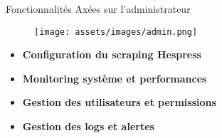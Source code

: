 \begin{frame}{Fonctionnalités Axées sur l'administrateur}
    \begin{figure}[H]
        \centering
        \texttt{[image: assets/images/admin.png]}
    \end{figure}

    \begin{itemize}
        \setlength\itemsep{0.8em} %
        \item \textbf{Configuration du scraping Hespress}
        \item \textbf{Monitoring système et performances}
        \item \textbf{Gestion des utilisateurs et permissions}
        \item \textbf{Gestion des logs et alertes}
    \end{itemize}
\end{frame}
